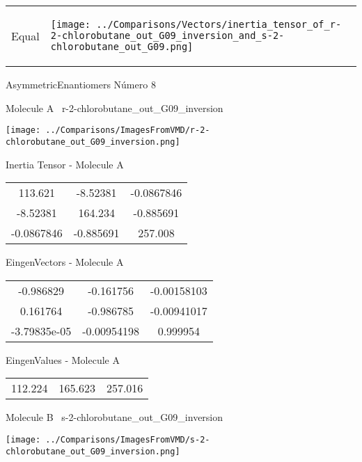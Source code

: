 \vtab[-5mm]
\begin{tabular}{*{2}{m{}}}
\begin{center}
\textcolor{NavyBlue}{\Large Equal}
\end{center}
&
\begin{center}
\texttt{[image: ../Comparisons/Vectors/inertia\_tensor\_of\_r-2-chlorobutane\_out\_G09\_inversion\_and\_s-2-chlorobutane\_out\_G09.png]}
\end{center}
\end{tabular}

 \newpage

\vtab[-3cm]
\begin{center}
{\large AsymmetricEnantiomers \tab Número 8}
\end{center}
\begin{multicols}{2}
\begin{center}

Molecule A \
r-2-chlorobutane\_out\_G09\_inversion

\texttt{[image: ../Comparisons/ImagesFromVMD/r-2-chlorobutane\_out\_G09\_inversion.png]}

Inertia Tensor - Molecule A \\
\begin{tabular}{|c c c|}
113.621	 & 	-8.52381	 & 	-0.0867846	 \\
-8.52381	 & 	164.234	 & 	-0.885691	 \\
-0.0867846	 & 	-0.885691	 & 	257.008
\end{tabular}

\vtab
 EingenVectors - Molecule A     \\
\begin{tabular}{|c c c|}
-0.986829	 & 	-0.161756	 & 	-0.00158103	 \\
0.161764	 & 	-0.986785	 & 	-0.00941017	 \\
-3.79835e-05	 & 	-0.00954198	 & 	0.999954
\end{tabular}

\vtab
 EingenValues - Molecule A     \\
\begin{tabular}{|c c c|}
112.224	 & 	165.623	 & 	257.016	 \\
\end{tabular}
\columnbreak

Molecule B \
s-2-chlorobutane\_out\_G09\_inversion

\texttt{[image: ../Comparisons/ImagesFromVMD/s-2-chlorobutane\_out\_G09\_inversion.png]}


\end{center}
\end{multicols}

